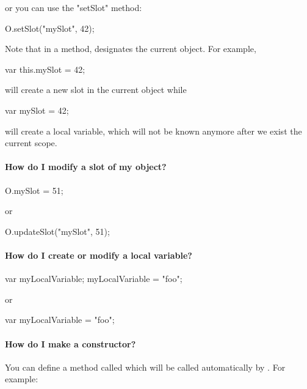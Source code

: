 \noindent
or you can use the "setSlot" method:

\begin{urbifixme}
O.setSlot("mySlot", 42);
\end{urbifixme}

Note that in a method,  designates the current object. For example,

\begin{urbifixme}
var this.mySlot = 42;
\end{urbifixme}

\noindent
will create a new slot in the current object while

\begin{urbifixme}
var mySlot = 42;
\end{urbifixme}

\noindent
will create a local variable, which will not be known anymore after we
exist the current scope.

\paragraph{How do I modify a slot of my object?}
\begin{urbifixme}
O.mySlot = 51;
\end{urbifixme}

\noindent
or

\begin{urbifixme}
O.updateSlot("mySlot", 51);
\end{urbifixme}

\paragraph{How do I create or modify a local variable?}
\begin{urbifixme}
var myLocalVariable;
myLocalVariable = "foo";
\end{urbifixme}

\noindent
or

\begin{urbifixme}
var myLocalVariable = "foo";
\end{urbifixme}


\paragraph{How do I make a constructor?}
You can define a method called  which will be called
automatically by . For example:

